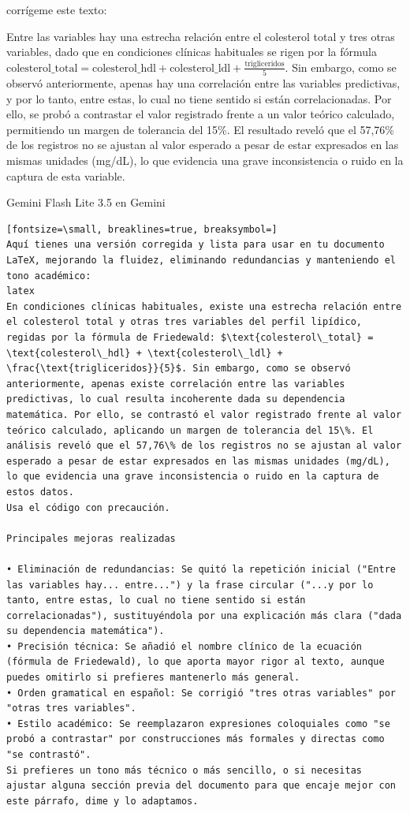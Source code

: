 \documentclass[12pt,a4paper,oneside]{book}
\begin{document}
\begin{iaprompt}
\begin{iaprompt}
corrígeme este texto:

Entre las variables hay una estrecha relación entre el colesterol total y tres otras variables, dado que en condiciones clínicas habituales se rigen por la fórmula $\text{colesterol\_total} = \text{colesterol\_hdl} + \text{colesterol\_ldl} + \frac{\text{trigliceridos}}{5}$. Sin embargo, como se observó anteriormente, apenas hay una correlación entre las variables predictivas, y por lo tanto, entre estas, lo cual no tiene sentido si están correlacionadas. Por ello, se probó a contrastar el valor registrado frente a un valor teórico calculado, permitiendo un margen de tolerancia del 15\%. El resultado reveló que el 57,76\% de los registros no se ajustan al valor esperado a pesar de estar expresados en las mismas unidades (mg/dL), lo que evidencia una grave inconsistencia o ruido en la captura de esta variable.
\end{iaprompt}
\begin{iaresp}{Gemini Flash Lite 3.5 en Gemini}
\begin{Verbatim}[fontsize=\small, breaklines=true, breaksymbol=]
Aquí tienes una versión corregida y lista para usar en tu documento LaTeX, mejorando la fluidez, eliminando redundancias y manteniendo el tono académico:
latex
En condiciones clínicas habituales, existe una estrecha relación entre el colesterol total y otras tres variables del perfil lipídico, regidas por la fórmula de Friedewald: $\text{colesterol\_total} = \text{colesterol\_hdl} + \text{colesterol\_ldl} + \frac{\text{trigliceridos}}{5}$. Sin embargo, como se observó anteriormente, apenas existe correlación entre las variables predictivas, lo cual resulta incoherente dada su dependencia matemática. Por ello, se contrastó el valor registrado frente al valor teórico calculado, aplicando un margen de tolerancia del 15\%. El análisis reveló que el 57,76\% de los registros no se ajustan al valor esperado a pesar de estar expresados en las mismas unidades (mg/dL), lo que evidencia una grave inconsistencia o ruido en la captura de estos datos.
Usa el código con precaución.

Principales mejoras realizadas

• Eliminación de redundancias: Se quitó la repetición inicial ("Entre las variables hay... entre...") y la frase circular ("...y por lo tanto, entre estas, lo cual no tiene sentido si están correlacionadas"), sustituyéndola por una explicación más clara ("dada su dependencia matemática").
• Precisión técnica: Se añadió el nombre clínico de la ecuación (fórmula de Friedewald), lo que aporta mayor rigor al texto, aunque puedes omitirlo si prefieres mantenerlo más general.
• Orden gramatical en español: Se corrigió "tres otras variables" por "otras tres variables".
• Estilo académico: Se reemplazaron expresiones coloquiales como "se probó a contrastar" por construcciones más formales y directas como "se contrastó".
Si prefieres un tono más técnico o más sencillo, o si necesitas ajustar alguna sección previa del documento para que encaje mejor con este párrafo, dime y lo adaptamos.


\end{Verbatim}
\end{iaresp}
\end{iaprompt}
\end{document}
